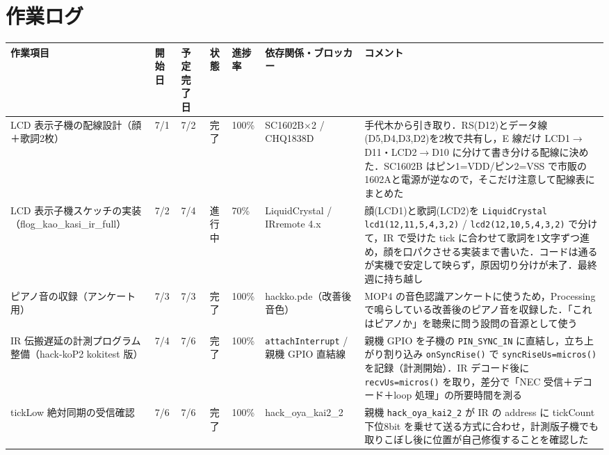 \documentclass[a4paper,11pt]{ltjsarticle}
\providecommand{\％}{\%}
\begin{document}
\section{作業ログ}\label{sec:worklog}

\renewcommand{\arraystretch}{1.4}

\begingroup
\setlength{\tabcolsep}{3pt}
\sloppy
{\footnotesize
\begin{longtable}{|p{2.6cm}|p{1.1cm}|p{1.3cm}|p{1.0cm}|p{0.9cm}|p{2.2cm}|p{4.5cm}|}
\hline
\rowcolor[gray]{0.9}
作業項目 & 開始日 & 予定完了日 & 状態 & 進捗率 & 依存関係・ブロッカー & コメント \\
\hline
LCD 表示子機の配線設計（顔＋歌詞2枚） & 7/1 & 7/2 & 完了 & 100\％ & SC1602B$\times$2 / CHQ1838D & 手代木から引き取り．RS(D12)とデータ線(D5,D4,D3,D2)を2枚で共有し，E 線だけ LCD1$\to$D11・LCD2$\to$D10 に分けて書き分ける配線に決めた．SC1602B はピン1=VDD/ピン2=VSS で市販の1602Aと電源が逆なので，そこだけ注意して配線表にまとめた \\
\hline
LCD 表示子機スケッチの実装（flog\_kao\_kasi\_ir\_full） & 7/2 & 7/4 & 進行中 & 70\％ & LiquidCrystal / IRremote 4.x & 顔(LCD1)と歌詞(LCD2)を \texttt{LiquidCrystal lcd1(12,11,5,4,3,2)} / \texttt{lcd2(12,10,5,4,3,2)} で分けて，IR で受けた tick に合わせて歌詞を1文字ずつ進め，顔を口パクさせる実装まで書いた．コードは通るが実機で安定して映らず，原因切り分けが未了．最終週に持ち越し \\
\hline
ピアノ音の収録（アンケート用） & 7/3 & 7/3 & 完了 & 100\％ & hackko.pde（改善後音色） & MOP4 の音色認識アンケートに使うため，Processing で鳴らしている改善後のピアノ音を収録した．「これはピアノか」を聴衆に問う設問の音源として使う \\
\hline
IR 伝搬遅延の計測プログラム整備（hack-koP2 kokitest 版） & 7/4 & 7/6 & 完了 & 100\％ & \texttt{attachInterrupt} / 親機 GPIO 直結線 & 親機 GPIO を子機の \texttt{PIN\_SYNC\_IN} に直結し，立ち上がり割り込み \texttt{onSyncRise()} で \texttt{syncRiseUs=micros()} を記録（計測開始）．IR デコード後に \texttt{recvUs=micros()} を取り，差分で「NEC 受信＋デコード＋loop 処理」の所要時間を測る \\
\hline
tickLow 絶対同期の受信確認 & 7/6 & 7/6 & 完了 & 100\％ & hack\_oya\_kai2\_2 & 親機 \texttt{hack\_oya\_kai2\_2} が IR の address に tickCount 下位8bit を乗せて送る方式に合わせ，計測版子機でも取りこぼし後に位置が自己修復することを確認した \\
\hline
\end{longtable}
}
\endgroup
\end{document}
